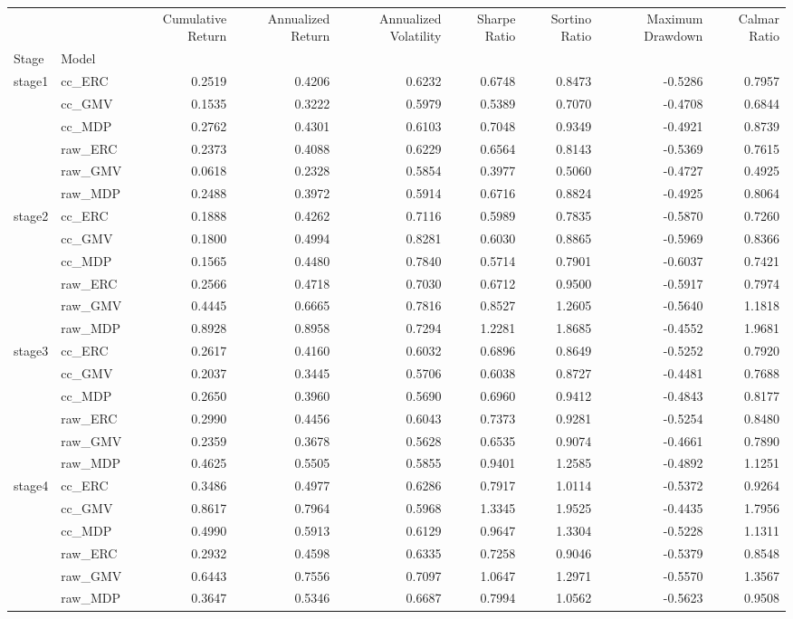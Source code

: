 \begin{tabular}{llrrrrrrr}
\toprule
 &  & Cumulative Return & Annualized Return & Annualized Volatility & Sharpe Ratio & Sortino Ratio & Maximum Drawdown & Calmar Ratio \\
Stage & Model &  &  &  &  &  &  &  \\
\midrule
\multirow[t]{6}{*}{stage1} & cc_ERC & 0.2519 & 0.4206 & 0.6232 & 0.6748 & 0.8473 & -0.5286 & 0.7957 \\
 & cc_GMV & 0.1535 & 0.3222 & 0.5979 & 0.5389 & 0.7070 & -0.4708 & 0.6844 \\
 & cc_MDP & 0.2762 & 0.4301 & 0.6103 & 0.7048 & 0.9349 & -0.4921 & 0.8739 \\
 & raw_ERC & 0.2373 & 0.4088 & 0.6229 & 0.6564 & 0.8143 & -0.5369 & 0.7615 \\
 & raw_GMV & 0.0618 & 0.2328 & 0.5854 & 0.3977 & 0.5060 & -0.4727 & 0.4925 \\
 & raw_MDP & 0.2488 & 0.3972 & 0.5914 & 0.6716 & 0.8824 & -0.4925 & 0.8064 \\
\cline{1-9}
\multirow[t]{6}{*}{stage2} & cc_ERC & 0.1888 & 0.4262 & 0.7116 & 0.5989 & 0.7835 & -0.5870 & 0.7260 \\
 & cc_GMV & 0.1800 & 0.4994 & 0.8281 & 0.6030 & 0.8865 & -0.5969 & 0.8366 \\
 & cc_MDP & 0.1565 & 0.4480 & 0.7840 & 0.5714 & 0.7901 & -0.6037 & 0.7421 \\
 & raw_ERC & 0.2566 & 0.4718 & 0.7030 & 0.6712 & 0.9500 & -0.5917 & 0.7974 \\
 & raw_GMV & 0.4445 & 0.6665 & 0.7816 & 0.8527 & 1.2605 & -0.5640 & 1.1818 \\
 & raw_MDP & 0.8928 & 0.8958 & 0.7294 & 1.2281 & 1.8685 & -0.4552 & 1.9681 \\
\cline{1-9}
\multirow[t]{6}{*}{stage3} & cc_ERC & 0.2617 & 0.4160 & 0.6032 & 0.6896 & 0.8649 & -0.5252 & 0.7920 \\
 & cc_GMV & 0.2037 & 0.3445 & 0.5706 & 0.6038 & 0.8727 & -0.4481 & 0.7688 \\
 & cc_MDP & 0.2650 & 0.3960 & 0.5690 & 0.6960 & 0.9412 & -0.4843 & 0.8177 \\
 & raw_ERC & 0.2990 & 0.4456 & 0.6043 & 0.7373 & 0.9281 & -0.5254 & 0.8480 \\
 & raw_GMV & 0.2359 & 0.3678 & 0.5628 & 0.6535 & 0.9074 & -0.4661 & 0.7890 \\
 & raw_MDP & 0.4625 & 0.5505 & 0.5855 & 0.9401 & 1.2585 & -0.4892 & 1.1251 \\
\cline{1-9}
\multirow[t]{6}{*}{stage4} & cc_ERC & 0.3486 & 0.4977 & 0.6286 & 0.7917 & 1.0114 & -0.5372 & 0.9264 \\
 & cc_GMV & 0.8617 & 0.7964 & 0.5968 & 1.3345 & 1.9525 & -0.4435 & 1.7956 \\
 & cc_MDP & 0.4990 & 0.5913 & 0.6129 & 0.9647 & 1.3304 & -0.5228 & 1.1311 \\
 & raw_ERC & 0.2932 & 0.4598 & 0.6335 & 0.7258 & 0.9046 & -0.5379 & 0.8548 \\
 & raw_GMV & 0.6443 & 0.7556 & 0.7097 & 1.0647 & 1.2971 & -0.5570 & 1.3567 \\
 & raw_MDP & 0.3647 & 0.5346 & 0.6687 & 0.7994 & 1.0562 & -0.5623 & 0.9508 \\
\cline{1-9}
\bottomrule
\end{tabular}
